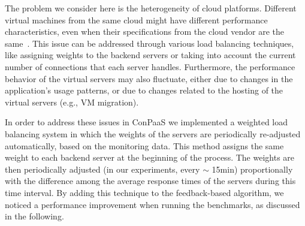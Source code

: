 
The problem we consider here is the heterogeneity of cloud platforms.
Different virtual machines from the same cloud might have different performance
characteristics, even when their specifications from the cloud vendor are 
the same~\cite{ec2Performance}. This issue can be addressed through various 
load balancing techniques, like assigning weights to the backend servers or 
taking into account the current number of connections that each server 
handles. Furthermore, the performance behavior of the virtual servers may 
also fluctuate, either due to changes in the application's usage 
patterns, or due to changes related to the hosting of the virtual servers 
(e.g., VM migration).

In order to address these issues in ConPaaS we implemented a weighted 
load balancing system in which the weights of the servers are 
periodically re-adjusted automatically, based on the monitoring data.  
This method assigns the same weight to each backend server at the 
beginning of the process. The weights are then periodically
adjusted (in our experiments, every $\sim$ 15min) proportionally 
with the difference among the average response times of the servers 
during this time interval. By adding this technique to the feedback-based
algorithm, we noticed a performance improvement when running the
benchmarks, as discussed in the following.

